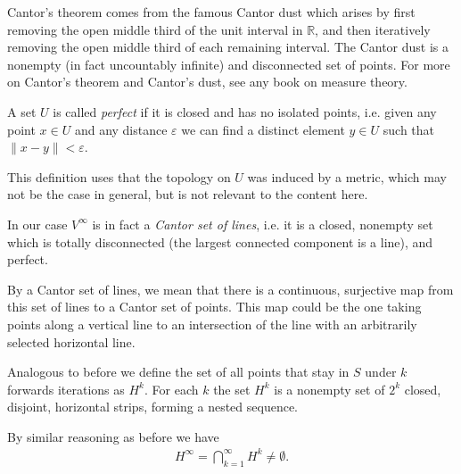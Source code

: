 \begin{remark}[]
	Cantor's theorem comes from the famous Cantor dust which arises by first removing the open middle third of the unit interval in $\mathbb{R}$, and then iteratively removing the open middle third of each remaining interval. The Cantor dust is a nonempty (in fact uncountably infinite) and disconnected set of points. For more on Cantor's theorem and Cantor's dust, see any book on measure theory.
\end{remark}

\begin{definition}
	A set $U$ is called \emph{perfect} if it is closed and has no isolated points, i.e. given any point $x\in U$ and any distance $\varepsilon$ we can find a distinct element $y\in U$ such that $\|x-y\| < \varepsilon$.
\end{definition}
\begin{remark}[]
	This definition uses that the topology on $U$ was induced by a metric, which may not be the case in general, but is not relevant to the content here.
\end{remark}

In our case $V^\infty$ is in fact a \emph{Cantor set of lines}, i.e. it is a closed, nonempty set which is totally disconnected (the largest connected component is a line), and perfect.
\begin{remark}[]
By a Cantor set of lines, we mean that there is a continuous, surjective map from this set of lines to a Cantor set of points. This map could be the one taking points along a vertical line to an intersection of the line with an arbitrarily selected horizontal line.
\end{remark}

\begin{definition}
	Analogous to before we define the set of all points that stay in $S$ under $k$ forwards iterations as $H^{k}$. For each $k$ the set $H ^{k}$ is a nonempty set of $2^k$ closed, disjoint, horizontal strips, forming a nested sequence.
\end{definition}
By similar reasoning as before we have 
\begin{align}
	\boxed{
		H^{\infty } = \bigcap_{k=1}^{\infty} H^{k} \neq \emptyset.
	}
\end{align}


